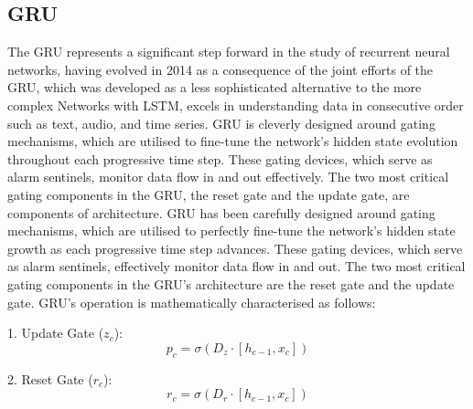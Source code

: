 \documentclass[a4paper,fleqn]{cas-sc}
\begin{document}





\subsection{GRU}
The GRU represents a significant step forward in the study of recurrent neural networks, having evolved in 2014 as a consequence of the joint efforts of the GRU, which was developed as a less sophisticated alternative to the more complex Networks with LSTM, excels in understanding data in consecutive order such as text, audio, and time series. GRU is cleverly designed around gating mechanisms, which are utilised to fine-tune the network's hidden state evolution throughout each progressive time step. These gating devices, which serve as alarm sentinels, monitor data flow in and out effectively\cite{he2019wind}. The two most critical gating components in the GRU, the reset gate and the update gate, are components of architecture\cite{wu2016investigating,khadka2017evolving}. GRU has been carefully designed around gating mechanisms, which are utilised to perfectly fine-tune the network's hidden state growth as each progressive time step advances. These gating devices, which serve as alarm sentinels, effectively monitor data flow in and out. The two most critical gating components in the GRU's architecture are the reset gate and the update gate\cite{badescu2008modeling}. GRU's operation is mathematically characterised as follows:


1. Update Gate ($z_c$):
\begin{equation}
p_c = \sigma(D_z \cdot [h_{c-1}, x_c])
\end{equation}

2. Reset Gate ($r_c$):
\begin{equation}
r_c = \sigma(D_r \cdot [h_{c-1}, x_c])
\end{equation}
\end{document}
